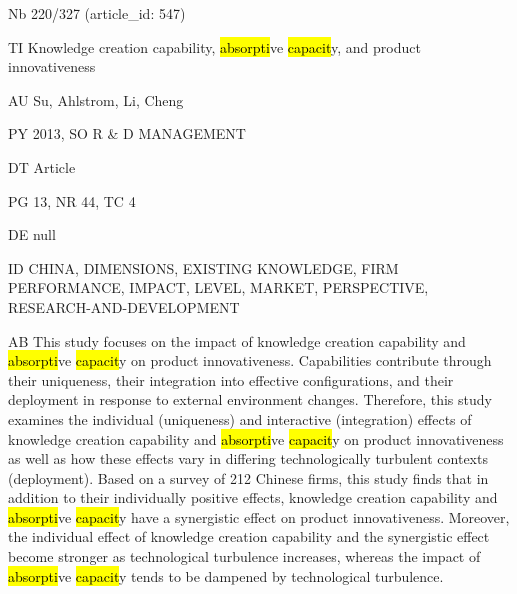 \documentclass[a4paper]{article}
\begin{document}
\vspace*{-2cm}
Nb \tabto{0cm}220/327 (article\_id: 547)\par
TI \tabto{0cm}Knowledge creation capability, \hl{absorpti}ve \hl{capacit}y, and product innovativeness\par
AU \tabto{0cm}Su, Ahlstrom, Li, Cheng\par
PY \tabto{0cm}2013, SO R \& D MANAGEMENT\par
DT \tabto{0cm}Article\par
PG \tabto{0cm}13, NR 44, TC 4\par
DE \tabto{0cm}null\par
ID \tabto{0cm}CHINA, DIMENSIONS, EXISTING KNOWLEDGE, FIRM PERFORMANCE, IMPACT, LEVEL, MARKET, PERSPECTIVE, RESEARCH-AND-DEVELOPMENT\par
AB \tabto{0cm}This study focuses on the impact of knowledge creation capability and \hl{absorpti}ve \hl{capacit}y on product innovativeness. Capabilities contribute through their uniqueness, their integration into effective configurations, and their deployment in response to external environment changes. Therefore, this study examines the individual (uniqueness) and interactive (integration) effects of knowledge creation capability and \hl{absorpti}ve \hl{capacit}y on product innovativeness as well as how these effects vary in differing technologically turbulent contexts (deployment). Based on a survey of 212 Chinese firms, this study finds that in addition to their individually positive effects, knowledge creation capability and \hl{absorpti}ve \hl{capacit}y have a synergistic effect on product innovativeness. Moreover, the individual effect of knowledge creation capability and the synergistic effect become stronger as technological turbulence increases, whereas the impact of \hl{absorpti}ve \hl{capacit}y tends to be dampened by technological turbulence.\par
\clearpage
\end{document}
